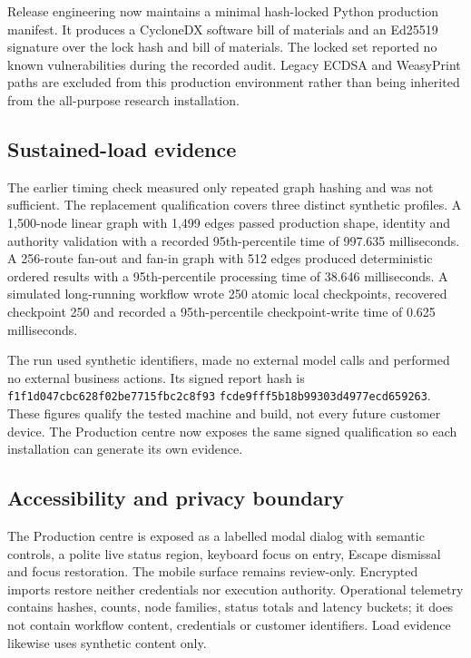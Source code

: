 Release engineering now maintains a minimal hash-locked Python production manifest. It produces a
CycloneDX software bill of materials and an Ed25519 signature over the lock hash and bill of
materials. The locked set reported no known vulnerabilities during the recorded audit. Legacy ECDSA
and WeasyPrint paths are excluded from this production environment rather than being inherited from
the all-purpose research installation.

\subsection{Sustained-load evidence}

The earlier timing check measured only repeated graph hashing and was not sufficient. The replacement
qualification covers three distinct synthetic profiles. A 1,500-node linear graph with 1,499 edges
passed production shape, identity and authority validation with a recorded 95th-percentile time of
997.635 milliseconds. A 256-route fan-out and fan-in graph with 512 edges produced deterministic
ordered results with a 95th-percentile processing time of 38.646 milliseconds. A simulated
long-running workflow wrote 250 atomic local checkpoints, recovered checkpoint 250 and recorded a
95th-percentile checkpoint-write time of 0.625 milliseconds.

The run used synthetic identifiers, made no external model calls and performed no external business
actions. Its signed report hash is
\texttt{f1f1d047cbc628f0}\allowbreak\texttt{2be7715fbc2c8f93}\allowbreak
\texttt{fcde9fff5b18b993}\allowbreak\texttt{03d4977ecd659263}.
These figures qualify the tested machine and build, not every future customer device. The Production
centre now exposes the same signed qualification so each installation can generate its own evidence.

\subsection{Accessibility and privacy boundary}

The Production centre is exposed as a labelled modal dialog with semantic controls, a polite live
status region, keyboard focus on entry, Escape dismissal and focus restoration. The mobile surface
remains review-only. Encrypted imports restore neither credentials nor execution authority.
Operational telemetry contains hashes, counts, node families, status totals and latency buckets; it
does not contain workflow content, credentials or customer identifiers. Load evidence likewise uses
synthetic content only.


